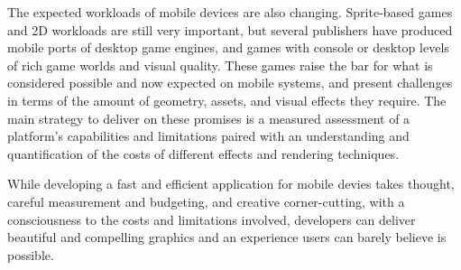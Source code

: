 The expected workloads of mobile devices are also changing.  Sprite-based games
and 2D workloads are still very important, but several publishers have
produced mobile ports of desktop game engines, and games with console or
desktop levels of rich game worlds and visual quality.  These games raise the
bar for what is considered possible and now expected on mobile systems, and
present challenges in terms of the amount of geometry, assets, and visual
effects they require.  The main strategy to deliver on these promises is a
measured assessment of a platform's capabilities and limitations paired with an
understanding and quantification of the costs of different effects and
rendering techniques.  

While developing a fast and efficient application for mobile devies takes
thought, careful measurement and budgeting, and creative corner-cutting, with a
consciousness to the costs and limitations involved, developers can deliver
beautiful and compelling graphics and an experience users can barely believe is
possible.

 











